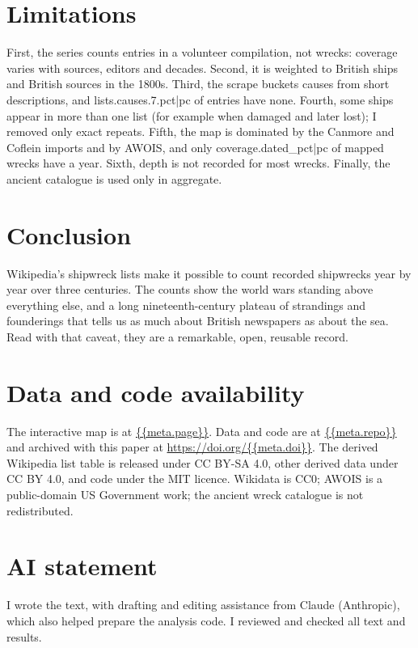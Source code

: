 \documentclass[11pt,a4paper]{article}
\begin{document}
\section{Limitations}
First, the series counts entries in a volunteer compilation, not wrecks: coverage varies with sources, editors and decades. Second, it is weighted to British ships and British sources in the 1800s. Third, the scrape buckets causes from short descriptions, and {{lists.causes.7.pct|pc}} of entries have none. Fourth, some ships appear in more than one list (for example when damaged and later lost); I removed only exact repeats. Fifth, the map is dominated by the Canmore and Coflein imports and by AWOIS, and only {{coverage.dated_pct|pc}} of mapped wrecks have a year. Sixth, depth is not recorded for most wrecks. Finally, the ancient catalogue is used only in aggregate.

\section{Conclusion}
Wikipedia's shipwreck lists make it possible to count recorded shipwrecks year by year over three centuries. The counts show the world wars standing above everything else, and a long nineteenth-century plateau of strandings and founderings that tells us as much about British newspapers as about the sea. Read with that caveat, they are a remarkable, open, reusable record.

\section*{Data and code availability}
The interactive map is at \url{{{meta.page}}}. Data and code are at \url{{{meta.repo}}} and archived with this paper at \url{https://doi.org/{{meta.doi}}}. The derived Wikipedia list table is released under CC BY-SA 4.0, other derived data under CC BY 4.0, and code under the MIT licence. Wikidata is CC0; AWOIS is a public-domain US Government work; the ancient wreck catalogue is not redistributed.

\section*{AI statement}
I wrote the text, with drafting and editing assistance from Claude (Anthropic), which also helped prepare the analysis code. I reviewed and checked all text and results.
\end{document}
